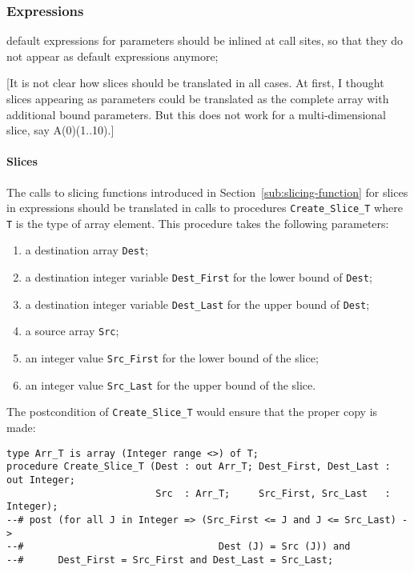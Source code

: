 \documentclass{article}
\begin{document}
\subsubsection{Expressions}

default expressions for parameters should be inlined at call sites, so
  that they do not appear as default expressions anymore;

[It is not clear how slices should be translated in all cases. At first, I
thought slices appearing as parameters could be translated as the complete
array with additional bound parameters. But this does not work for a
multi-dimensional slice, say A(0)(1..10).]

\paragraph{Slices}

The calls to slicing functions introduced in Section~\ref{sub:slicing-function}
for slices in expressions should be translated in calls to procedures
\verb|Create_Slice_T| where \verb|T| is the type of array element. This
procedure takes the following parameters:
\begin{enumerate}
\item a destination array \verb|Dest|;
\item a destination integer variable \verb|Dest_First| for the lower bound of
  \verb|Dest|;
\item a destination integer variable \verb|Dest_Last| for the upper bound of
  \verb|Dest|;
\item a source array \verb|Src|;
\item an integer value \verb|Src_First| for the lower bound of the slice;
\item an integer value \verb|Src_Last| for the upper bound of the slice.
\end{enumerate}

The postcondition of \verb|Create_Slice_T| would ensure that the proper copy is
made:
\begin{verbatim}
type Arr_T is array (Integer range <>) of T;
procedure Create_Slice_T (Dest : out Arr_T; Dest_First, Dest_Last : out Integer;
                          Src  : Arr_T;     Src_First, Src_Last   : Integer);
--# post (for all J in Integer => (Src_First <= J and J <= Src_Last) ->
--#                                  Dest (J) = Src (J)) and
--#      Dest_First = Src_First and Dest_Last = Src_Last;
\end{verbatim}
\end{document}
